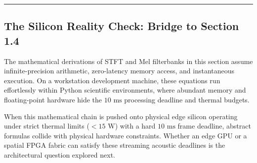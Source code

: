 \documentclass[11pt,a4paper]{article}
\begin{document}
\vspace{5mm}
\hrule
\vspace{5mm}

\subsection*{The Silicon Reality Check: Bridge to Section 1.4}

The mathematical derivations of STFT and Mel filterbanks in this section assume infinite-precision arithmetic, zero-latency memory access, and instantaneous execution. On a workstation development machine, these equations run effortlessly within Python scientific environments, where abundant memory and floating-point hardware hide the $10\text{ ms}$ processing deadline and thermal budgets.

When this mathematical chain is pushed onto physical edge silicon operating under strict thermal limits ($< 15\text{ W}$) with a hard $10\text{ ms}$ frame deadline, abstract formulas collide with physical hardware constraints. Whether an edge GPU or a spatial FPGA fabric can satisfy these streaming acoustic deadlines is the architectural question explored next.
\end{document}
